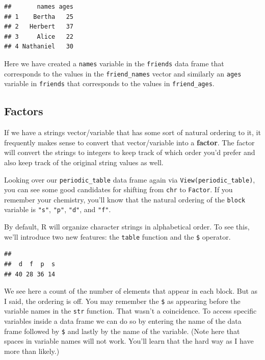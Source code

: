\documentclass[]{tufte-book}
\newenvironment{Shaded}{\begin{snugshade}}{\end{snugshade}}
\newcommand{\KeywordTok}[1]{\textcolor[rgb]{0.13,0.29,0.53}{\textbf{{#1}}}}
\newcommand{\NormalTok}[1]{{#1}}
\theoremstyle{definition}
\theoremstyle{definition}
\theoremstyle{remark}
\begin{document}
\begin{verbatim}
##       names ages
## 1    Bertha   25
## 2   Herbert   37
## 3     Alice   22
## 4 Nathaniel   30
\end{verbatim}

Here we have created a \texttt{names} variable in the \texttt{friends}
data frame that corresponds to the values in the \texttt{friend\_names}
vector and similarly an \texttt{ages} variable in \texttt{friends} that
corresponds to the values in \texttt{friend\_ages}.

\subsection{Factors}\label{factors}

If we have a strings vector/variable that has some sort of natural
ordering to it, it frequently makes sense to convert that
vector/variable into a \textbf{factor}. The factor will convert the
strings to integers to keep track of which order you'd prefer and also
keep track of the original string values as well.

Looking over our \texttt{periodic\_table} data frame again via
\texttt{View(periodic\_table)}, you can see some good candidates for
shifting from \texttt{chr} to \texttt{Factor}. If you remember your
chemistry, you'll know that the natural ordering of the \texttt{block}
variable is \texttt{"s"}, \texttt{"p"}, \texttt{"d"}, and \texttt{"f"}.

By default, R will organize character strings in alphabetical order. To
see this, we'll introduce two new features: the \texttt{table} function
and the \texttt{\$} operator.

\begin{Shaded}
\end{Shaded}

\begin{verbatim}
## 
##  d  f  p  s 
## 40 28 36 14
\end{verbatim}

We see here a count of the number of elements that appear in each block.
But as I said, the ordering is off. You may remember the \texttt{\$} as
appearing before the variable names in the \texttt{str} function. That
wasn't a coincidence. To access specific variables inside a data frame
we can do so by entering the name of the data frame followed by
\texttt{\$} and lastly by the name of the variable. (Note here that
spaces in variable names will not work. You'll learn that the hard way
as I have more than likely.)
\end{document}
